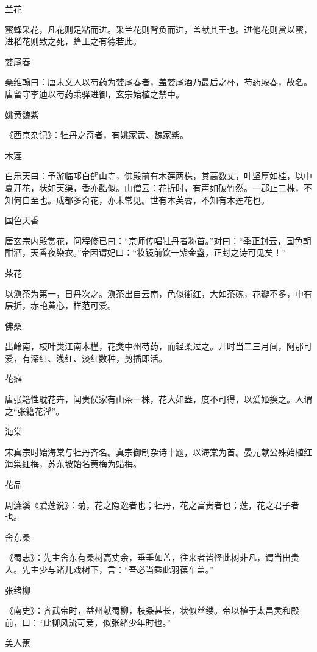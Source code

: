 \documentclass[a4paper,12pt,UTF8,twoside]{ctexbook}
\begin{document}
    兰花
    
    蜜蜂采花，凡花则足粘而进。采兰花则背负而进，盖献其王也。进他花则赏以蜜，进稻花则致之死，蜂王之有德若此。
    
    婪尾春
    
    桑维翰曰：唐末文人以芍药为婪尾春者，盖婪尾酒乃最后之杯，芍药殿春，故名。唐留守李迪以芍药乘驿进御，玄宗始植之禁中。
    
    姚黄魏紫
    
    《西京杂记》：牡丹之奇者，有姚家黄、魏家紫。
    
    木莲
    
    白乐天曰：予游临邛白鹤山寺，佛殿前有木莲两株，其高数丈，叶坚厚如桂，以中夏开花，状如芙渠，香亦酷似。山僧云：花折时，有声如破竹然。一郡止二株，不知何自至也。成都多奇花，亦未常见。世有木芙蓉，不知有木莲花也。
    
    国色天香
    
    唐玄宗内殿赏花，问程修已曰：“京师传唱牡丹者称首。”对曰：“季正封云，国色朝酣酒，天香夜染衣。”帝因谓妃曰：“妆镜前饮一紫金盏，正封之诗可见矣！”
    
    茶花
    
    以滇茶为第一，日丹次之。滇茶出自云南，色似衢红，大如茶碗，花瓣不多，中有层折，赤艳黄心，样范可爱。
    
    佛桑
    
    出岭南，枝叶类江南木槿，花类中州芍药，而轻柔过之。开时当二三月间，阿那可爱，有深红、浅红、淡红数种，剪插即活。
    
    花癖
    
    唐张籍性耽花卉，闻贵侯家有山茶一株，花大如盎，度不可得，以爱姬换之。人谓之“张籍花淫”。
    
    海棠
    
    宋真宗时始海棠与牡丹齐名。真宗御制杂诗十题，以海棠为首。晏元献公殊始植红海棠红梅，苏东坡始名黄梅为蜡梅。
    
    花品
    
    周濂溪《爱莲说》：菊，花之隐逸者也；牡丹，花之富贵者也；莲，花之君子者也。
    
    舍东桑
    
    《蜀志》：先主舍东有桑树高丈余，垂垂如盖，往来者皆怪此树非凡，谓当出贵人。先主少与诸儿戏树下，言：“吾必当乘此羽葆车盖。”
    
    张绪柳
    
    《南史》：齐武帝时，益州献蜀柳，枝条甚长，状似丝缕。帝以植于太昌灵和殿前，曰：“此柳风流可爱，似张绪少年时也。”
    
    美人蕉
    
\end{document}

